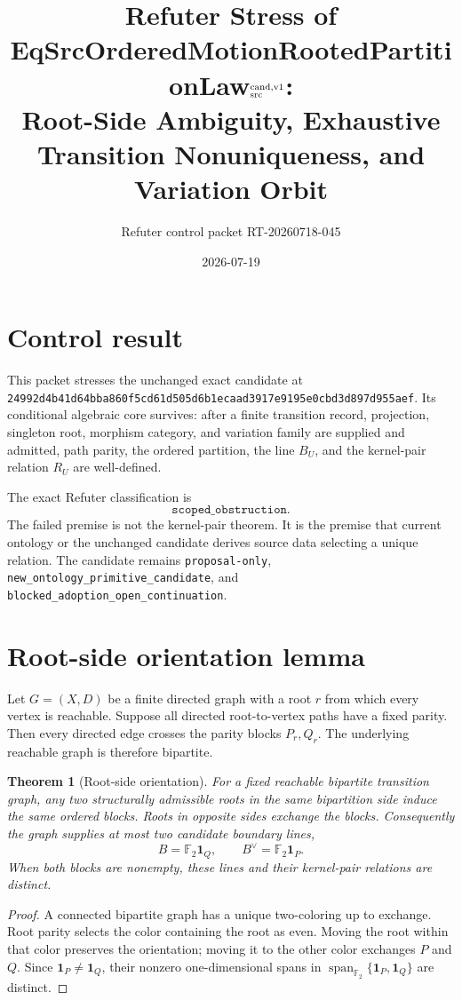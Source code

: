 \documentclass[11pt]{article}
\title{Refuter Stress of
EqSrcOrderedMotionRootedPartitionLaw\(_{\rm src}^{\rm cand,v1}\):\\
Root-Side Ambiguity, Exhaustive Transition Nonuniqueness, and Variation Orbit}
\author{Refuter control packet RT-20260718-045}
\date{2026-07-19}
\newtheorem{theorem}{Theorem}
\newcommand{\Ftwo}{\mathbb F_2}
\begin{document}
\maketitle

\section{Control result}

This packet stresses the unchanged exact candidate at
\texttt{24992d4b41d64bba860f5cd61d505d6b1ecaad3917e9195e0cbd3d897d955aef}.
Its conditional algebraic core survives: after a finite transition record,
projection, singleton root, morphism category, and variation family are
supplied and admitted, path parity, the ordered partition, the line
\(B_U\), and the kernel-pair relation \(R_U\) are well-defined.

The exact Refuter classification is
\[
  \texttt{scoped\_obstruction}.
\]
The failed premise is not the kernel-pair theorem. It is the premise that
current ontology or the unchanged candidate derives source data selecting a
unique relation. The candidate remains \texttt{proposal-only},
\texttt{new\_ontology\_primitive\_candidate}, and
\texttt{blocked\_adoption\_open\_continuation}.

\section{Root-side orientation lemma}

Let \(G=(X,D)\) be a finite directed graph with a root \(r\) from which every
vertex is reachable. Suppose all directed root-to-vertex paths have a fixed
parity. Then every directed edge crosses the parity blocks \(P_r,Q_r\).
The underlying reachable graph is therefore bipartite.

\begin{theorem}[Root-side orientation]
For a fixed reachable bipartite transition graph, any two structurally
admissible roots in the same bipartition side induce the same ordered blocks.
Roots in opposite sides exchange the blocks. Consequently the graph supplies
at most two candidate boundary lines,
\[
 B=\Ftwo\mathbf 1_Q,\qquad B^\vee=\Ftwo\mathbf 1_P.
\]
When both blocks are nonempty, these lines and their kernel-pair relations are
distinct.
\end{theorem}

\begin{proof}
A connected bipartite graph has a unique two-coloring up to exchange.
Root parity selects the color containing the root as even. Moving the root
within that color preserves the orientation; moving it to the other color
exchanges \(P\) and \(Q\). Since
\(\mathbf 1_P\neq\mathbf 1_Q\), their nonzero one-dimensional spans in
\(\operatorname{span}_{\Ftwo}\{\mathbf 1_P,\mathbf 1_Q\}\) are distinct.
\end{proof}
\end{document}
